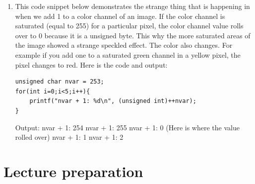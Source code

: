\documentclass{article}
\begin{document}
\begin{enumerate}
\item
This code snippet below demonstrates the strange thing that is happening in when we add 1 to a color channel of an image. If the color channel is saturated (equal to 255) for a particular pixel, the color channel value rolls over to 0 because it is a unsigned byte. This why the more saturated areas of the image showed a strange speckled effect. The color also changes. For example if you add one to a saturated green channel in a  yellow pixel, the pixel changes to red.
\newline\newline
Here is the code and output:
\begin{lstlisting}
unsigned char nvar = 253;
for(int i=0;i<5;i++){
    printf("nvar + 1: %d\n", (unsigned int)++nvar);
}
\end{lstlisting}

Output:
\newline
nvar + 1: 254
\newline
nvar + 1: 255
\newline
nvar + 1: 0   (Here is where the value rolled over)
\newline
nvar + 1: 1
\newline
nvar + 1: 2

\end{enumerate}

\section{Lecture preparation}
\end{document}
